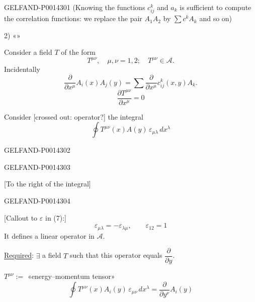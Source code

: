 \begin{GelfandAdjacentEvidence}{GELFAND-P001430}{1}
(Knowing the functions \(c_{ij}^k\) and \(a_k\) is sufficient to compute the correlation functions:
we replace the pair \(A_1A_2\) by \(\sum c^kA_k\) and so on)

2) «»

Consider a field \(T\) of the form
\[
T^{\mu\nu},\quad\mu,\nu=1,2;\quad T^{\mu\nu}\in\mathcal A.
\]
Incidentally
\begin{equation*}
\tag{5}
\frac{\partial}{\partial x^\mu}A_i(x)A_j(y)
=\sum\frac{\partial}{\partial x^\mu}c_{ij}^k(x,y)A_k.
\end{equation*}
\begin{equation*}
\tag{6}
\frac{\partial T^{\mu\nu}}{\partial x^\mu}=0
\end{equation*}

Consider [crossed out: operator?] the integral
\begin{equation*}
\tag{7}
\oint T^{\mu\nu}(x)A(y)\,\varepsilon_{\mu\lambda}\,dx^\lambda
\end{equation*}
\end{GelfandAdjacentEvidence}
\begin{GelfandAdjacentEvidence}{GELFAND-P001430}{2}

\end{GelfandAdjacentEvidence}
\begin{GelfandAdjacentEvidence}{GELFAND-P001430}{3}

[To the right of the integral]
\end{GelfandAdjacentEvidence}
\begin{GelfandAdjacentEvidence}{GELFAND-P001430}{4}


[Callout to \(\varepsilon\) in (7):]
\[
\varepsilon_{\mu\lambda}=-\varepsilon_{\lambda\mu},\qquad\varepsilon_{12}=1
\]
It defines a linear operator in \(\mathcal A\).

\uline{Required}: \(\exists\) a field \(T\) such that this operator equals \(\dfrac{\partial}{\partial y}\).

\(T^{\mu\nu}:=\) «energy–momentum tensor»
\[
\oint T^{\mu\nu}(x)A_i(y)\,\varepsilon_{\mu\nu}\,dx^\lambda
=\frac{\partial}{\partial y^\nu}A_i(y)
\]
\end{GelfandAdjacentEvidence}


